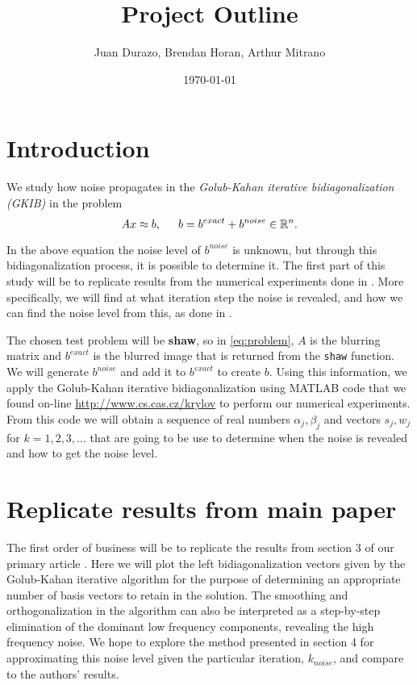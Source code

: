 \documentclass[11pt]{amsart}
\title{Project Outline}
\author{Juan Durazo, Brendan Horan, Arthur Mitrano}
\date{\today}  %
\begin{document}
\maketitle

\section{Introduction}
We study how noise propagates in the \emph{Golub-Kahan iterative bidiagonalization (GKIB)} in the
problem 
\begin{equation} \label{eq:problem}
	Ax\approx b, \indent  b=b^{exact} + b^{noise} \in \mathbb{R}^n.
\end{equation}

In the above equation the noise level of $b^{noise}$ is unknown, but through this bidiagonalization
process, it is possible to determine it. The first part of this study will be to replicate results
from the numerical experiments done in \cite{bidiagonalization}. More specifically, we will find
at what iteration step the noise is revealed, and how we can find the noise level from this, as
done in \cite{bidiagonalization}.

The chosen test problem will be {\bf shaw}, so in \eqref{eq:problem}, $A$ is the blurring matrix and
$b^{exact}$ is the blurred image that is returned from the \texttt{shaw} function. We will generate 
$b^{noise}$ and add it to $b^{exact}$ to create $b$. Using this information, we apply the Golub-Kahan
iterative bidiagonalization using MATLAB code that we found on-line \url{http://www.cs.cas.cz/krylov}
to perform our numerical experiments. From this code we will obtain a sequence of real numbers 
$\alpha_j,\beta_j$ and vectors $s_j,w_j$ for $k=1,2,3,\ldots$ that are going to be use to determine
when the noise is revealed and how to get the noise level.


\section{Replicate results from main paper}
The first order of business will be to replicate the results from section 3 of our primary article 
\cite{bidiagonalization}. Here we will plot the left bidiagonalization vectors given by the Golub-Kahan
iterative algorithm for the purpose of determining an appropriate number of basis vectors to retain in
the solution. The smoothing and orthogonalization in the algorithm can also be interpreted as a step-by-step
elimination of the dominant low frequency components, revealing the high frequency noise. We hope to 
explore the method presented in section 4 for approximating this noise level given the particular iteration,
$k_{noise}$, and compare to the authors' results.
\end{document}
